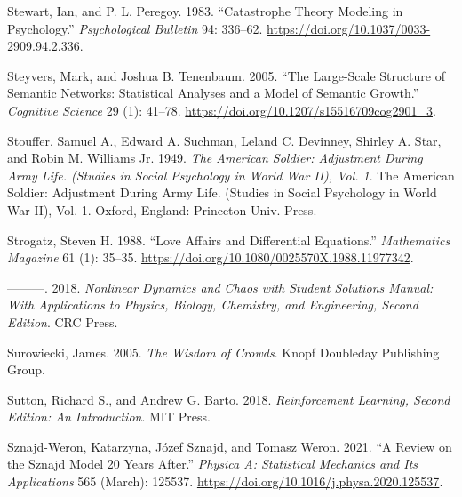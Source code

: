 \documentclass[
  a4paper,
  DIV=11,
  numbers=noendperiod,
  oneside]{scrreprt}
\newlength{\cslhangindent}
\newlength{\cslentryspacingunit} %
\newenvironment{CSLReferences}[2] %
 {%
  \setlength{\parindent}{0pt}
  \ifodd #1
  \let\oldpar\par
  \def\par{\hangindent=\cslhangindent\oldpar}
  \fi
  \setlength{\parskip}{#2\cslentryspacingunit}
 }%
 {}
\begin{document}
\begin{CSLReferences}{1}{0}
\leavevmode{}%
Stewart, Ian, and P. L. Peregoy. 1983. {``Catastrophe Theory Modeling in
Psychology.''} \emph{Psychological Bulletin} 94: 336--62.
\url{https://doi.org/10.1037/0033-2909.94.2.336}.

\leavevmode{}%
Steyvers, Mark, and Joshua B. Tenenbaum. 2005. {``The {Large-Scale
Structure} of {Semantic Networks}: {Statistical Analyses} and a {Model}
of {Semantic Growth}.''} \emph{Cognitive Science} 29 (1): 41--78.
\url{https://doi.org/10.1207/s15516709cog2901_3}.

\leavevmode{}%
Stouffer, Samuel A., Edward A. Suchman, Leland C. Devinney, Shirley A.
Star, and Robin M. Williams Jr. 1949. \emph{The {American} Soldier:
{Adjustment} During Army Life. ({Studies} in Social Psychology in {World
War II}), {Vol}. 1}. The {American} Soldier: {Adjustment} During Army
Life. ({Studies} in Social Psychology in {World War II}), {Vol}. 1.
{Oxford, England}: {Princeton Univ. Press}.

\leavevmode{}%
Strogatz, Steven H. 1988. {``Love {Affairs} and {Differential
Equations}.''} \emph{Mathematics Magazine} 61 (1): 35--35.
\url{https://doi.org/10.1080/0025570X.1988.11977342}.

\leavevmode{}%
---------. 2018. \emph{Nonlinear {Dynamics} and {Chaos} with {Student
Solutions Manual}: {With Applications} to {Physics}, {Biology},
{Chemistry}, and {Engineering}, {Second Edition}}. {CRC Press}.

\leavevmode{}%
Surowiecki, James. 2005. \emph{The {Wisdom} of {Crowds}}. {Knopf
Doubleday Publishing Group}.

\leavevmode{}%
Sutton, Richard S., and Andrew G. Barto. 2018. \emph{Reinforcement
{Learning}, Second Edition: {An Introduction}}. {MIT Press}.

\leavevmode{}%
Sznajd-Weron, Katarzyna, Józef Sznajd, and Tomasz Weron. 2021. {``A
Review on the {Sznajd} Model \textemdash{} 20 Years After.''}
\emph{Physica A: Statistical Mechanics and Its Applications} 565
(March): 125537. \url{https://doi.org/10.1016/j.physa.2020.125537}.


\end{CSLReferences}
\end{document}
